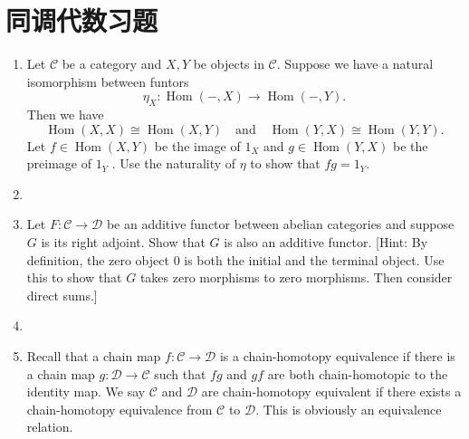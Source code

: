 \newcommand{\C}{\mathbb{C}}
\newcommand{\ct}{\mathcal{C}}
\newcommand{\A}{\mathcal{A}}
\newcommand{\D}{\mathcal{D}}
\newcommand{\Hom}{\operatorname{Hom}}
\newcommand{\Sh}{\textit{Sh}}
\newcommand{\F}{\mathcal{F}}
\newcommand{\G}{\mathcal{G}}
\section{同调代数习题}
\begin{enumerate}
    \item[11.1]Let $\ct$ be a category and $X, Y$ be objects in $\ct$. Suppose we have a natural
isomorphism between funtors\[\eta_X \colon \Hom(-,X) \to \Hom(-,Y).\]
Then we have\[\Hom(X,X) \cong \Hom(X,Y)\quad\text{and}\quad\Hom(Y,X) \cong \Hom(Y,Y).\]
Let $f \in \Hom(X,Y)$ be the image of $1_X$ and $g \in \Hom(Y,X)$ be the
preimage of $1_Y$ . Use the naturality of $\eta$ to show that $fg = 1_Y$.
    \item[\textbf{证明：}]
    \item[11.2]Let $F \colon \ct \to \D$ be an additive functor between abelian categories and
suppose $G$ is its right adjoint. Show that $G$ is also an additive functor.
[Hint: By definition, the zero object $0$ is both the initial and the terminal
object. Use this to show that $G$ takes zero morphisms to zero morphisms.
Then consider direct sums.]
    \item[\textbf{证明：}]
    \item[11.3]Recall that a chain map $f \colon \ct \to \D$ is a chain-homotopy equivalence if
there is a chain map $g \colon \D \to \ct$ such that $fg$ and $gf$ are both chain-homotopic to the identity map. We say $\ct$ and $\D$ are chain-homotopy
equivalent if there exists a chain-homotopy equivalence from $\ct$ to $\D$. This
is obviously an equivalence relation.


\end{enumerate}
